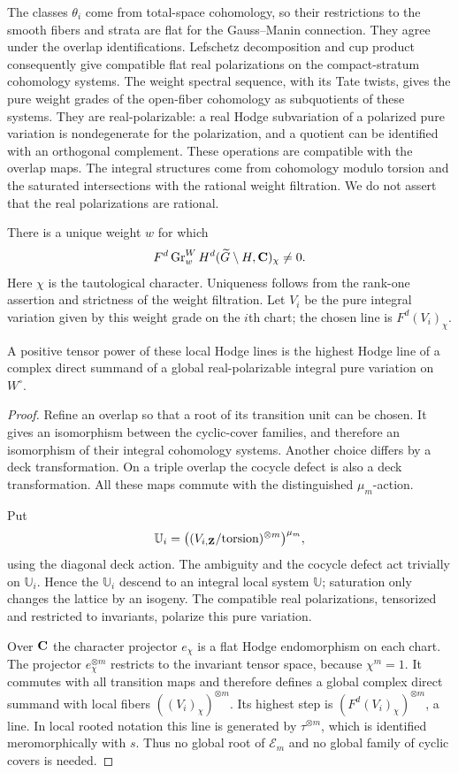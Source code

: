The classes $\theta_i$ come from total-space cohomology, so their
restrictions to the smooth fibers and strata are flat for the
Gauss--Manin connection.  They agree under the overlap
identifications.  Lefschetz decomposition and cup product consequently
give compatible flat real polarizations on the compact-stratum
cohomology systems.  The weight spectral sequence, with its Tate
twists, gives the pure weight grades of the open-fiber cohomology as
subquotients of these systems.  They are real-polarizable: a real Hodge
subvariation of a polarized pure variation is nondegenerate for the
polarization, and a quotient can be identified with an orthogonal
complement.  These operations are compatible with the overlap maps.
The integral structures come from cohomology modulo torsion and the
saturated intersections with the rational weight filtration.  We do
not assert that the real polarizations are rational.

There is a unique weight $w$ for which
\[
 F^d\operatorname{Gr}^W_w H^d(\widetilde G\setminus H,\mathbf C)_\chi\ne0.
\]
Here $\chi$ is the tautological character.  Uniqueness follows from
the rank-one assertion and strictness of the weight filtration.  Let
$V_i$ be the pure integral variation given by this weight grade on
the $i$th chart; the chosen line is $F^d(V_i)_\chi$.

\begin{lemma}\label{rankone:descent}
A positive tensor power of these local Hodge lines is the highest
Hodge line of a complex direct summand of a global real-polarizable
integral pure variation on $W^\circ$.
\end{lemma}

\begin{proof}
Refine an overlap so that a root of its transition unit can be
chosen.  It gives an isomorphism between the cyclic-cover families,
and therefore an isomorphism of their integral cohomology systems.
Another choice differs by a deck transformation.  On a triple
overlap the cocycle defect is also a deck transformation.  All these
maps commute with the distinguished $\mu_m$-action.

Put
\[
 \mathbb U_i=
 \bigl((V_{i,\mathbf Z}/\text{torsion})^{\otimes m}\bigr)^{\mu_m},
\]
using the diagonal deck action.  The ambiguity and the cocycle defect
act trivially on $\mathbb U_i$.  Hence the $\mathbb U_i$ descend to
an integral local system $\mathbb U$; saturation only changes the
lattice by an isogeny.  The compatible real polarizations, tensorized
and restricted to invariants, polarize this pure variation.

Over $\mathbf C$ the character projector $e_\chi$ is a flat Hodge
endomorphism on each chart.  The projector
$e_\chi^{\otimes m}$ restricts to the invariant tensor space,
because $\chi^m=1$.  It commutes with all transition maps and
therefore defines a global complex direct summand with local fibers
$((V_i)_\chi)^{\otimes m}$.  Its highest step is
$(F^d(V_i)_\chi)^{\otimes m}$, a line.  In local rooted notation
this line is generated by $\tau^{\otimes m}$, which is identified
meromorphically with $s$.  Thus no global root of $\mathcal E_m$ and
no global family of cyclic covers is needed.
\end{proof}


